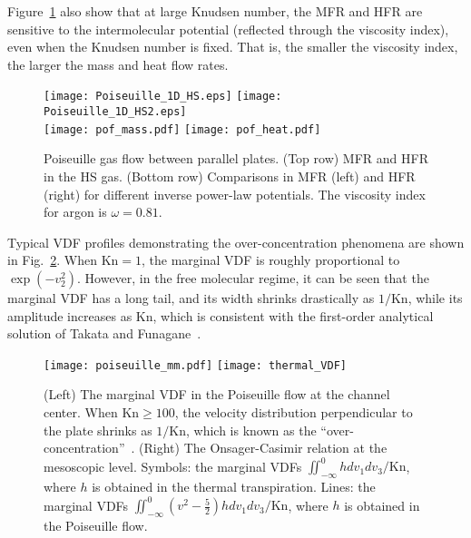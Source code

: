 Figure~\ref{massheat} also show that at large Knudsen number, the MFR and HFR are sensitive to the intermolecular potential (reflected through the viscosity index), even when the Knudsen number is fixed. That is, the smaller the viscosity index, the larger the mass and heat flow rates. 


\begin{figure}[t]
	\centering
	{\texttt{[image: Poiseuille\_1D\_HS.eps]}} 	{\texttt{[image: Poiseuille\_1D\_HS2.eps]}}\\
	{\texttt{[image: pof\_mass.pdf]}}\quad
	{\texttt{[image: pof\_heat.pdf]}}
	\caption{ Poiseuille gas flow between parallel plates. (Top row) MFR and HFR in the HS gas. (Bottom row) Comparisons in MFR (left) and HFR (right) for different inverse power-law potentials. The viscosity index for argon is $\omega=0.81$.  } 
	\label{massheat}
\end{figure}


Typical VDF profiles demonstrating the over-concentration phenomena are shown in Fig.~\ref{Onsager0}. When $\text{Kn}=1$, the marginal VDF is roughly proportional to $\exp(-v_2^2)$. However, in the free molecular regime, it can be seen that the marginal VDF has a long tail, and its width shrinks drastically as $1/\text{Kn}$, while its amplitude increases as $\text{Kn}$, which is consistent with the first-order analytical solution of Takata and Funagane~\cite{Takata2011}. 



\begin{figure}[t]
	\centering
	\texttt{[image: poiseuille\_mm.pdf]}
    \texttt{[image: thermal\_VDF]}
	\caption{ 
		(Left) The marginal VDF in the Poiseuille flow at the channel center. When $\text{Kn}\ge100$, the velocity distribution perpendicular to the plate shrinks as $1/\text{Kn}$, which is known as the ``over-concentration''~\cite{Takata2011}. (Right) 	The Onsager-Casimir relation at the mesoscopic level. Symbols: the marginal VDFs  $\iint_{-\infty}^0{} hdv_1dv_3/\text{Kn}$, where $h$ is obtained in the thermal transpiration. Lines: the marginal VDFs  $\iint_{-\infty}^0{} \left(v^2-\frac{5}{2}\right)hdv_1dv_3/\text{Kn}$, where $h$ is obtained in the Poiseuille flow.
	} 
	\label{Onsager0}
\end{figure}

